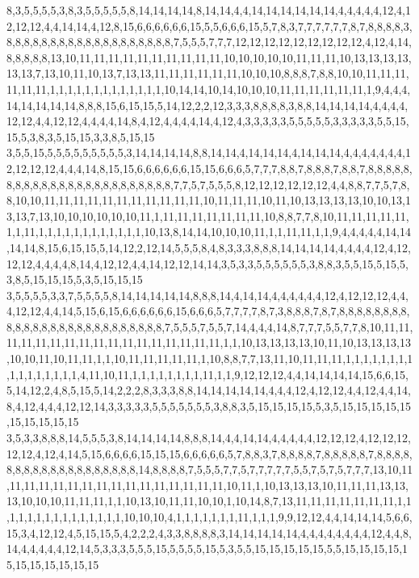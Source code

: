 8,3,5,5,5,5,3,8,3,5,5,5,5,5,8,14,14,14,14,8,14,14,4,4,14,14,14,14,14,14,4,4,4,4,4,12,4,12,12,12,4,4,14,14,4,12,8,15,6,6,6,6,6,6,15,5,5,6,6,6,15,5,7,8,3,7,7,7,7,7,7,8,7,8,8,8,8,3,8,8,8,8,8,8,8,8,8,8,8,8,8,8,8,8,8,8,8,7,5,5,5,7,7,7,12,12,12,12,12,12,12,12,12,4,12,4,14,8,8,8,8,8,13,10,11,11,11,11,11,11,11,11,11,11,10,10,10,10,10,11,11,11,10,13,13,13,13,13,13,7,13,10,11,10,13,7,13,13,11,11,11,11,11,11,10,10,10,8,8,8,7,8,8,10,10,11,11,11,11,11,11,1,1,1,1,1,1,1,1,1,1,1,1,1,10,14,14,10,14,10,10,10,11,11,11,11,11,11,1,9,4,4,4,14,14,14,14,14,8,8,8,15,6,15,15,5,14,12,2,2,12,3,3,3,8,8,8,8,3,8,8,14,14,14,14,4,4,4,4,12,12,4,4,12,12,4,4,4,4,14,8,4,12,4,4,4,4,14,4,12,4,3,3,3,3,3,5,5,5,5,5,3,3,3,3,3,5,5,15,15,5,3,8,3,5,15,15,3,3,8,5,15,15
3,5,5,15,5,5,5,5,5,5,5,5,5,3,14,14,14,14,8,8,14,14,4,14,14,14,4,14,14,14,4,4,4,4,4,4,4,12,12,12,12,4,4,4,14,8,15,15,6,6,6,6,6,6,15,15,6,6,6,5,7,7,7,8,8,7,8,8,8,7,8,8,7,8,8,8,8,8,8,8,8,8,8,8,8,8,8,8,8,8,8,8,8,8,8,8,8,7,7,5,7,5,5,5,8,12,12,12,12,12,12,4,4,8,8,7,7,5,7,8,8,10,10,11,11,11,11,11,11,11,11,11,11,11,10,11,11,11,10,11,10,13,13,13,13,10,10,13,13,13,7,13,10,10,10,10,10,10,11,1,11,11,11,11,11,11,11,10,8,8,7,7,8,10,11,11,11,11,11,1,1,11,1,1,1,1,1,1,1,1,1,1,1,1,10,13,8,14,14,10,10,10,11,1,1,11,11,1,1,9,4,4,4,4,4,14,14,14,14,8,15,6,15,15,5,14,12,2,12,14,5,5,5,8,4,8,3,3,3,8,8,8,14,14,14,14,4,4,4,4,12,4,12,12,12,4,4,4,4,8,14,4,12,12,4,4,14,12,12,14,14,3,5,3,3,5,5,5,5,5,5,3,8,8,3,5,5,15,5,15,5,3,8,5,15,15,15,5,3,5,15,15,15
3,5,5,5,5,3,3,7,5,5,5,5,8,14,14,14,14,14,8,8,8,14,4,14,14,4,4,4,4,4,4,12,4,12,12,12,4,4,4,12,12,4,4,14,5,15,6,15,6,6,6,6,6,6,15,6,6,6,5,7,7,7,7,8,7,3,8,8,8,7,8,7,8,8,8,8,8,8,8,8,8,8,8,8,8,8,8,8,8,8,8,8,8,8,8,8,8,8,7,5,5,5,7,5,5,7,14,4,4,4,14,8,7,7,7,5,5,7,7,8,10,11,11,11,11,11,11,11,11,11,11,11,11,11,11,11,11,11,1,1,10,13,13,13,13,10,11,10,13,13,13,13,10,10,11,10,11,11,1,1,10,11,11,11,11,11,1,10,8,8,7,7,13,11,10,11,11,11,1,1,1,1,1,1,1,1,1,1,1,1,1,1,1,1,4,11,10,11,1,1,1,1,1,1,1,1,11,1,1,9,12,12,12,4,4,14,14,14,14,15,6,6,15,5,14,12,2,4,8,5,15,5,14,2,2,2,8,3,3,3,8,8,14,14,14,14,14,4,4,4,12,4,12,12,4,4,12,4,4,14,8,4,12,4,4,4,12,12,14,3,3,3,3,3,5,5,5,5,5,5,5,3,8,8,3,5,15,15,15,15,5,3,5,15,15,15,15,15,15,15,15,15,15
3,5,3,3,8,8,8,14,5,5,5,3,8,14,14,14,14,8,8,8,14,4,4,14,14,4,4,4,4,4,12,12,12,4,12,12,12,12,12,4,12,4,14,5,15,6,6,6,6,15,15,15,6,6,6,6,6,5,7,8,8,3,7,8,8,8,8,7,8,8,8,8,8,7,8,8,8,8,8,8,8,8,8,8,8,8,8,8,8,8,8,8,8,14,8,8,8,8,7,5,5,5,7,7,5,7,7,7,7,7,5,5,7,5,7,5,7,7,7,13,10,11,11,11,11,11,11,11,11,11,11,11,11,11,11,11,11,10,11,1,10,13,13,13,10,11,11,11,13,13,13,10,10,10,11,11,11,1,1,10,13,10,11,11,10,10,1,10,14,8,7,13,11,11,11,11,11,11,11,1,1,1,1,1,1,1,1,1,1,1,1,1,1,1,10,10,10,4,1,1,1,1,1,1,1,11,1,1,1,9,9,12,12,4,4,14,14,14,5,6,6,15,3,4,12,12,4,5,15,15,5,4,2,2,2,4,3,3,8,8,8,8,3,14,14,14,14,14,4,4,4,4,4,4,4,4,12,4,4,8,14,4,4,4,4,4,12,14,5,3,3,3,5,5,5,15,5,5,5,5,15,5,3,5,5,15,15,15,15,15,5,5,15,15,15,15,15,15,15,15,15,15,15
